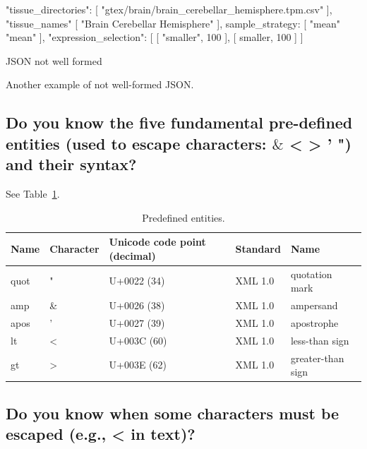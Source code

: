 \documentclass{article}
\begin{document}
\begin{center}
\begin{listing}[!ht]
  \begin{json}

      "tissue_directories": [
            "gtex/brain/brain_cerebellar_hemisphere.tpm.csv"
      ],
      "tissue_names" [
            "Brain Cerebellar Hemisphere"
      ],
      sample_strategy: [
            "mean"
            "mean"
      ],
      "expression_selection": [
            [
                  "smaller",
                  100
            ],
            [
                  smaller,
                  100
            ]
      ]

  \end{json}
  \caption[Test]{JSON not well formed}
  \label{lst:test2}
\end{listing}
\end{center}

Another example of not well-formed JSON.

\subsection{Do you know the five fundamental pre-defined entities (used to escape characters: $\&$ < > ' ") and their syntax?}

See Table~\ref{tab:predefinedentitites}.

\begin{table}
  \centering
  \begin{tabular}{lllll}
    \toprule
    Name & Character & Unicode code point (decimal) & Standard & Name\\
    \midrule
    quot & " & U+0022 (34) & XML 1.0 & quotation mark\\
    amp  & \& & U+0026 (38) & XML 1.0 & ampersand\\
    apos & ' & U+0027 (39) & XML 1.0 & apostrophe \\
    lt & < & U+003C (60) & XML 1.0 & less-than sign\\
    gt & > & U+003E (62) & XML 1.0 & greater-than sign\\
    \bottomrule
  \end{tabular}
  \caption{Predefined entities. }
  \label{tab:predefinedentitites}
\end{table}

\subsection{Do you know when some characters must be escaped (e.g., < in text)?}
\end{document}
